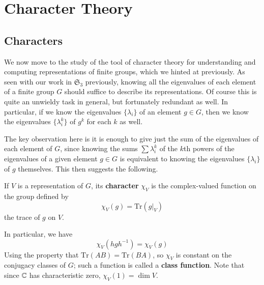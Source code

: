 %
%
%
\chapter{Character Theory}
\label{Char} %

\section{Characters}

We now move to the study of the tool of character theory for understanding and computing representations of finite groups, which we hinted at previously. As seen with our work in $\mathfrak{S}_3$ previously, knowing all the eigenvalues of each element of a finite group $G$ should suffice to describe its representations. Of course this is quite an unwieldy task in general, but fortunately redundant as well. In particular, if we know the eigenvalues $\{\lambda_i\}$ of an element $g \in G$, then we know the eigenvalues $\{\lambda_i^k\}$ of $g^k$ for each $k$ as well.

The key observation here is it is enough to give just the sum of the eigenvalues of each element of $G$, since knowing the sums $\sum \lambda_i^k$ of the $k$th powers of the eigenvalues of a given element $g\in G$ is equivalent to knowing the eigenvalues $\{\lambda_i\}$ of $g$ themselves. This then suggests the following.

\begin{definition}
    If $V$ is a representation of $G$, its \textbf{character} $\chi_V$ is the complex-valued function on the group defined by $$\chi_V(g) = \text{Tr}(g\vert_V)$$
    the trace of $g$ on $V$.
\end{definition}
In particular, we have \begin{equation*}
    \chi_V(hgh^{-1}) = \chi_V(g)
\end{equation*}
Using the property that $\text{Tr}(AB) = \text{Tr}(BA)$, so $\chi_V$ is constant on the conjugacy classes of $G$; such a function is called a \textbf{class function}. Note that since $\mathbb C$ has characteristic zero, $\chi_V(1) = \dim V$.

